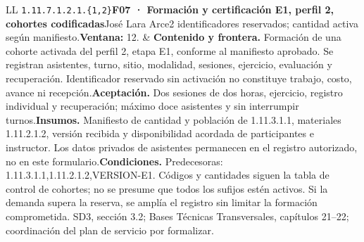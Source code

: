 \begin{longtable}{L{\tabcolsep\relax}L{\tabcolsep\relax}}
\texttt{1.\allowbreak{}11.\allowbreak{}7.\allowbreak{}1.\allowbreak{}2.\allowbreak{}1.\allowbreak{}\{1,\allowbreak{}2\}}\newline{}\textbf{F07 · Formación y certificación E1, perfil 2, cohortes codificadas}\newline{}José Lara Arce\newline{}2 identificadores reservados; cantidad activa según manifiesto.\newline{}\textbf{Ventana:} 12. & \textbf{Contenido y frontera.} Formación de una cohorte activada del perfil 2, etapa E1, conforme al manifiesto aprobado. Se registran asistentes, turno, sitio, modalidad, sesiones, ejercicio, evaluación y recuperación. Identificador reservado sin activación no constituye trabajo, costo, avance ni recepción.\newline{}\textbf{Aceptación.} Dos sesiones de dos horas, ejercicio, registro individual y recuperación; máximo doce asistentes y sin interrumpir turnos.\newline{}\textbf{Insumos.} Manifiesto de cantidad y población de 1.11.3.1.1, materiales 1.11.2.1.2, versión recibida y disponibilidad acordada de participantes e instructor. Los datos privados de asistentes permanecen en el registro autorizado, no en este formulario.\newline{}\textbf{Condiciones.} Predecesoras: 1.11.3.1.1,1.11.2.1.2,VERSION-E1. Códigos y cantidades siguen la tabla de control de cohortes; no se presume que todos los sufijos estén activos. Si la demanda supera la reserva, se amplía el registro sin limitar la formación comprometida. SD3, sección 3.2; Bases Técnicas Transversales, capítulos 21--22; coordinación del plan de servicio por formalizar.\\\hline

\end{longtable}
